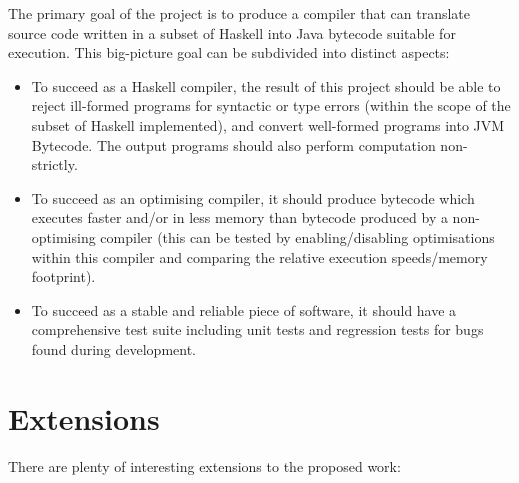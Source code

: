 \documentclass[12pt]{article}
\begin{document}
The primary goal of the project is to produce a compiler that can translate source code written in a subset of Haskell
into Java bytecode suitable for execution. This big-picture goal can be subdivided into distinct aspects:

\begin{itemize}
\item
{
    To succeed as a Haskell compiler, the result of this project should be able to reject ill-formed programs for
    syntactic or type errors (within the scope of the subset of Haskell implemented), and convert well-formed programs
    into JVM Bytecode. The output programs should also perform computation non-strictly.
}
\item
{
    To succeed as an optimising compiler, it should produce bytecode which executes faster and/or in less memory than
    bytecode produced by a non-optimising compiler (this can be tested by enabling/disabling optimisations within this
    compiler and comparing the relative execution speeds/memory footprint).
}
\item
{
    To succeed as a stable and reliable piece of software, it should have a comprehensive test suite including unit
    tests and regression tests for bugs found during development.
}
\end{itemize}


\section*{Extensions}

There are plenty of interesting extensions to the proposed work:
\end{document}
